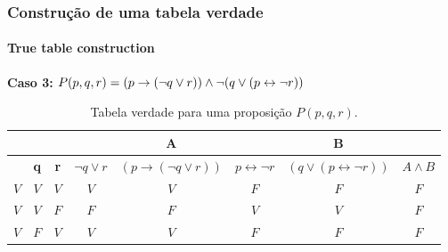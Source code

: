 {
\begin{frame}[t]
    \frametitle{Construção de uma tabela verdade}
    \framesubtitle{True table construction}
    \begin{exampleblock}{}
        \textbf{Caso 3:} $P(p,q,r) = (p \rightarrow (\lnot q \lor r)) \land \lnot (q \lor(p \leftrightarrow \lnot r))$
    \end{exampleblock}
    \begin{table}[]
        \caption{Tabela verdade para uma proposição $P(p,q,r)$.}
        \label{tab:tabela-caso-3}
        \renewcommand{\tabcolsep}{3pt}
        \begin{tabular}{cccc|c|c|c|c}
        \cline{5-5} \cline{7-7}
        \multicolumn{1}{l}{}                                     & \multicolumn{1}{l}{}                                    & \multicolumn{1}{l}{}                                    & \multicolumn{1}{l|}{} & \textbf{A}                         & \multicolumn{1}{l|}{}       & \textbf{B}                                      & \multicolumn{1}{l}{}                                     \\ \hline
        \rowcolor[HTML]{EFEFEF} 
        \multicolumn{1}{|c|}{\cellcolor[HTML]{EFEFEF}\textbf{p}} & \multicolumn{1}{c|}{\cellcolor[HTML]{EFEFEF}\textbf{q}} & \multicolumn{1}{c|}{\cellcolor[HTML]{EFEFEF}\textbf{r}} & $\lnot q \lor r$      & $(p \rightarrow (\lnot q \lor r))$ & $p \leftrightarrow \lnot r$ & \textbf{$(q \lor (p \leftrightarrow \lnot r))$} & \multicolumn{1}{c|}{\cellcolor[HTML]{EFEFEF}$A \land B$} \\ \hline
        \multicolumn{1}{|c|}{$V$}                                & \multicolumn{1}{c|}{$V$}                                & \multicolumn{1}{c|}{$V$}                                & $V$                   & $V$                                & $F$                         & $F$                                             & \multicolumn{1}{c|}{$F$}                                 \\ \hline
        \multicolumn{1}{|c|}{$V$}                                & \multicolumn{1}{c|}{$V$}                                & \multicolumn{1}{c|}{$F$}                                & $F$                   & $F$                                & $V$                         & $V$                                             & \multicolumn{1}{c|}{$F$}                                 \\ \hline
        \multicolumn{1}{|c|}{$V$}                                & \multicolumn{1}{c|}{$F$}                                & \multicolumn{1}{c|}{$V$}                                & $V$                   & $V$                                & $F$                         & $F$                                             & \multicolumn{1}{c|}{$F$}                                 \\ \hline

\end{tabular}
\end{table}
\end{frame}}
